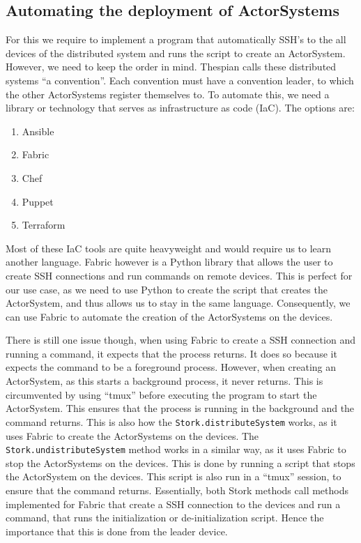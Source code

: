 \documentclass[a4paper]{article}
\begin{document}
\subsection{Automating the deployment of ActorSystems}
For this we require to implement a program that automatically SSH's to the all devices of the distributed system and runs the script to create an ActorSystem. However, we need to keep the order in mind. Thespian calls these distributed systems \enquote{a convention}. Each convention must have a convention leader, to which the other ActorSystems register themselves to.
To automate this, we need a library or technology that serves as infrastructure as code (IaC). The options are:
\begin{enumerate}
    \item Ansible
    \item Fabric
    \item Chef
    \item Puppet
    \item Terraform
\end{enumerate}
Most of these IaC tools are quite heavyweight and would require us to learn another language. Fabric however is a Python library that allows the user to create SSH connections and run commands on remote devices. This is perfect for our use case, as we need to use Python to create the script that creates the ActorSystem, and thus allows us to stay in the same language. Consequently, we can use Fabric to automate the creation of the ActorSystems on the devices.

There is still one issue though, when using Fabric to create a SSH connection and running a command, it expects that the process returns. It does so because it expects the command to be a foreground process. However, when creating an ActorSystem, as this starts a background process, it never returns. This is circumvented by using \enquote{tmux} before executing the program to start the ActorSystem. This ensures that the process is running in the background and the command returns. This is also how the \lstinline|Stork.distributeSystem| works, as it uses Fabric to create the ActorSystems on the devices. The \lstinline|Stork.undistributeSystem| method works in a similar way, as it uses Fabric to stop the ActorSystems on the devices. This is done by running a script that stops the ActorSystem on the devices. This script is also run in a \enquote{tmux} session, to ensure that the command returns. Essentially, both Stork methods call methods implemented for Fabric that create a SSH connection to the devices and run a command, that runs the initialization or de-initialization script. Hence the importance that this is done from the leader device.
\end{document}
